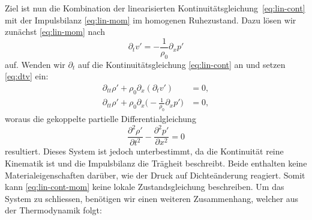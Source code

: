 Ziel ist nun die Kombination der linearisierten
Kontinuitätsgleichung~\eqref{eq:lin-cont}
mit der Impulsbilanz \eqref{eq:lin-mom} im homogenen Ruhezustand.
Dazu lösen wir zunächst \eqref{eq:lin-mom} nach
\begin{equation}
    \partial_t v' = -\frac{1}{\rho_0}\partial_x p'
    \label{eq:dtv}
\end{equation}
auf.
Wenden wir $\partial_t$ auf die Kontinuitätsgleichung \eqref{eq:lin-cont}
an und setzen \eqref{eq:dtv} ein:
\begin{align*}
    \partial_{tt}\rho' + \rho_0\partial_x(\partial_t v') &= 0,\\
    \partial_{tt}\rho' + \rho_0\partial_x \biggl(-\frac{1}{\rho_0}\partial_x p'\biggr) &= 0,
\end{align*}
woraus die gekoppelte partielle Differentialgleichung
\begin{equation}
    \frac{\partial^2 \rho'}{\partial t^2} - \frac{\partial^2 p'}{\partial x^2} = 0
    \label{eq:lin-cont-mom}
\end{equation}
resultiert.
Dieses System ist jedoch unterbestimmt, da die Kontinuität reine Kinematik
ist
und die Impulsbilanz die Trägheit beschreibt.
Beide enthalten keine Materialeigenschaften darüber, wie der Druck auf Dichteänderung reagiert.
Somit kann \eqref{eq:lin-cont-mom} keine lokale Zustandsgleichung beschreiben.
Um das System zu schliessen, benötigen wir einen weiteren Zusammenhang,
welcher aus der Thermodynamik folgt:

